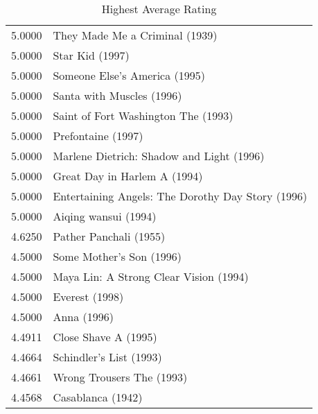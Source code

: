 \begin{flushleft}
\begin{table}[h]
\centering
\setlength{\tabcolsep}{12pt}


\begin{tabular}{|ll|}

\hline
5.0000 & They Made Me a Criminal (1939)                          \\
5.0000 & Star Kid (1997)                                         \\
5.0000 & Someone Else's America (1995)                           \\
5.0000 & Santa with Muscles (1996)                               \\
5.0000 & Saint of Fort Washington The (1993)                     \\
5.0000 & Prefontaine (1997)                                      \\
5.0000 & Marlene Dietrich: Shadow and Light (1996)               \\
5.0000 & Great Day in Harlem A (1994)                            \\
5.0000 & Entertaining Angels: The Dorothy Day Story (1996)       \\
5.0000 & Aiqing wansui (1994)                                    \\
4.6250 & Pather Panchali (1955)                                  \\
4.5000 & Some Mother's Son (1996)                                \\
4.5000 & Maya Lin: A Strong Clear Vision (1994)                  \\
4.5000 & Everest (1998)                                          \\
4.5000 & Anna (1996)                                             \\ \hline
4.4911 & Close Shave A (1995)                                    \\ \hline
4.4664 & Schindler's List (1993)                                 \\ \hline
4.4661 & Wrong Trousers The (1993)                               \\ \hline
4.4568 & Casablanca (1942)                                       \\ \hline
\end{tabular}
\caption{Highest Average Rating}
\end{table}
\end{flushleft}




